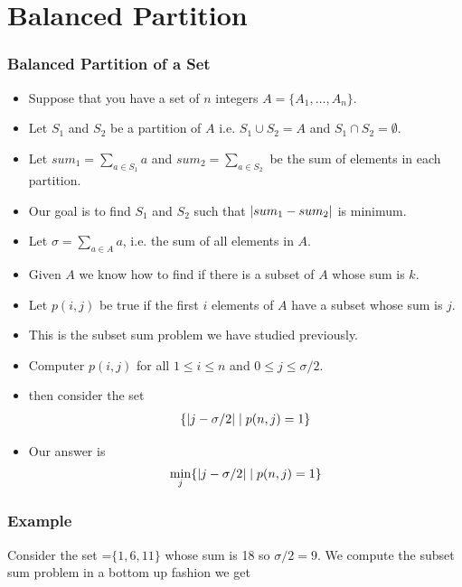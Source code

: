 \documentclass{beamer}
\DeclarePairedDelimiter\abs{\lvert}{\rvert}%
\begin{document}
\section{Balanced Partition}
\begin{frame}
  \frametitle{Balanced Partition of a Set}
  \begin{itemize}
  \item Suppose that you have a set of $n$ integers $A=\{A_1,\ldots, A_n\}$.
  \item Let $S_1$ and $S_2$ be a partition of $A$ i.e. $S_1\cup S_2=A$ and $S_1\cap S_2=\emptyset$.
 \item Let $sum_1=\sum_{a\in S_1}a$ and $sum_2=\sum_{a\in S_2}$ be the sum of elements in each partition.
 \item Our goal is to find $S_1$ and $S_2$ such that $\abs{sum_1-sum_2}$ is minimum.
  \end{itemize}
\end{frame}

\begin{frame}
  \begin{itemize}
  \item Let $\sigma=\sum_{a\in A}a$, i.e.  the sum of all elements in $A$.
  \item Given $A$ we know how to find if there is a subset of $A$ whose sum is $k$.
  \item Let $p(i,j)$ be true if the first $i$ elements of $A$ have a subset whose sum is $j$.
  \item This is the subset sum problem we have studied previously.
  \item Computer $p(i,j)$ for all $1\le i\le n$ and $0\le j\le \sigma/2$.
  \item then consider the set
    \begin{align*}
      \{ \abs{j-\sigma/2}\mid p(n,j)=1  \}
    \end{align*}
\item Our answer is 
  \begin{align*}
    \min_j\{ \abs{j-\sigma/2}\mid p(n,j)=1  \}
  \end{align*}
  \end{itemize}
\end{frame}
\begin{frame}
  \frametitle{Example}
  Consider the set =$\{1,6,11\}$ whose sum is 18 so $\sigma/2=9$. We compute the subset
  sum problem in a bottom up fashion we get
\end{frame}
\end{document}
